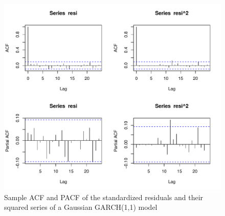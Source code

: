 \documentclass[a4paper,11pt]{article}\usepackage[]{graphicx}\usepackage[]{color}
\makeatletter
\def\maxwidth{ %
  \ifdim\Gin@nat@width>\linewidth
    \linewidth
  \else
    \Gin@nat@width
  \fi
}
\newenvironment{knitrout}{}{} %
\makeatother
\begin{document}
\begin{knitrout}
\color{fgcolor}\begin{figure}
\includegraphics[width=\maxwidth]{figure/model-chk-garch-1} \caption[Sample ACF and PACF of the standardized residuals and their squared series of a Gaussian GARCH(1,1) model]{Sample ACF and PACF of the standardized residuals and their squared series of a Gaussian GARCH(1,1) model}\label{fig:model-chk-garch}
\end{figure}


\end{knitrout}
\end{document}
